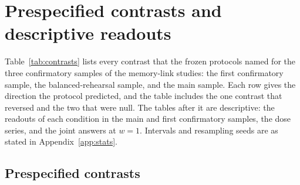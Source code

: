 \section{Prespecified contrasts and descriptive readouts}
\label{app:evidence}

Table~\ref{tab:contrasts} lists every contrast that the frozen protocols
named for the three confirmatory samples of the memory-link studies: the
first confirmatory sample, the balanced-rehearsal sample, and the main
sample. Each row gives the direction the protocol predicted, and the
table includes the one contrast that reversed and the two that were
null. The tables after it are descriptive: the readouts of each
condition in the main and first confirmatory samples, the dose series,
and the joint answers at $w=1$. Intervals and resampling seeds are as stated
in Appendix~\ref{app:stats}.

\subsection{Prespecified contrasts}

